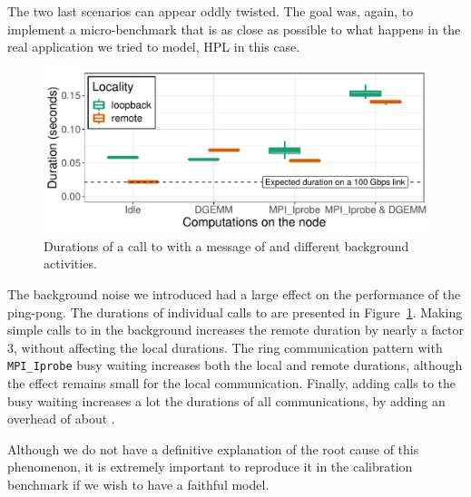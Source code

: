         The two last scenarios can appear oddly twisted. The goal was, again, to implement a micro-benchmark that is as
        close as possible to what happens in the real application we tried to model, HPL in this case.

        \begin{figure}[htpb]
            \centering
            \includegraphics[width=1\linewidth]{img/experiment/experimental_conditions/communication_computation_interference.pdf}
            \caption{Durations of a call to \recv with a message of  and different background
            activities.}%
            \label{fig:experiment:experimental_conditions}
        \end{figure}

        The background noise we introduced had a large effect on the performance of the ping-pong. The durations of
        individual calls to \recv are presented in Figure~\ref{fig:experiment:experimental_conditions}. Making simple
        calls to \dgemm in the background increases the remote duration by nearly a factor \(3\), without affecting the
        local durations. The ring communication pattern with \texttt{MPI\_Iprobe} busy waiting increases both the local
        and remote durations, although the effect remains small for the local communication. Finally, adding \dgemm
        calls to the busy waiting increases a lot the durations of all communications, by adding an overhead of about
        .

        Although we do not have a definitive explanation of the root cause of this phenomenon, it is extremely important
        to reproduce it in the calibration benchmark if we wish to have a faithful model.

